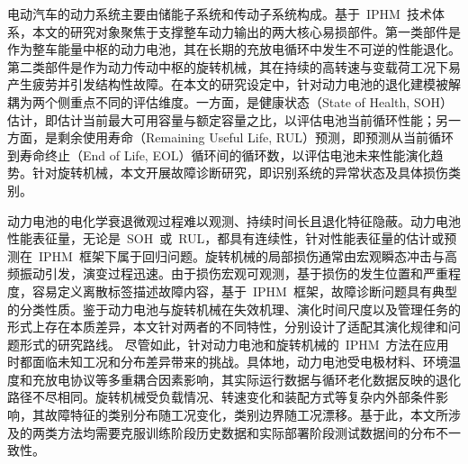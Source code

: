 电动汽车的动力系统主要由储能子系统和传动子系统构成。基于~IPHM~技术体系，本文的研究对象聚焦于支撑整车动力输出的两大核心易损部件。第一类部件是作为整车能量中枢的动力电池，其在长期的充放电循环中发生不可逆的性能退化。第二类部件是作为动力传动中枢的旋转机械，其在持续的高转速与变载荷工况下易产生疲劳并引发结构性故障。在本文的研究设定中，针对动力电池的退化建模被解耦为两个侧重点不同的评估维度。一方面，是健康状态（State of Health, SOH）估计，即估计当前最大可用容量与额定容量之比，以评估电池当前循环性能；另一方面，是剩余使用寿命（Remaining Useful Life, RUL）预测，即预测从当前循环到寿命终止（End of Life, EOL）循环间的循环数，以评估电池未来性能演化趋势。针对旋转机械，本文开展故障诊断研究，即识别系统的异常状态及具体损伤类别。

动力电池的电化学衰退微观过程难以观测、持续时间长且退化特征隐蔽。动力电池性能表征量，无论是~SOH~或~RUL，都具有连续性，针对性能表征量的估计或预测在~IPHM~框架下属于回归问题。旋转机械的局部损伤通常由宏观瞬态冲击与高频振动引发，演变过程迅速。由于损伤宏观可观测，基于损伤的发生位置和严重程度，容易定义离散标签描述故障内容，基于~IPHM~框架，故障诊断问题具有典型的分类性质。鉴于动力电池与旋转机械在失效机理、演化时间尺度以及管理任务的形式上存在本质差异，本文针对两者的不同特性，分别设计了适配其演化规律和问题形式的研究路线。
尽管如此，针对动力电池和旋转机械的~IPHM~方法在应用时都面临未知工况和分布差异带来的挑战。具体地，动力电池受电极材料、环境温度和充放电协议等多重耦合因素影响，其实际运行数据与循环老化数据反映的退化路径不尽相同。旋转机械受负载情况、转速变化和装配方式等复杂内外部条件影响，其故障特征的类别分布随工况变化，类别边界随工况漂移。基于此，本文所涉及的两类方法均需要克服训练阶段历史数据和实际部署阶段测试数据间的分布不一致性。


